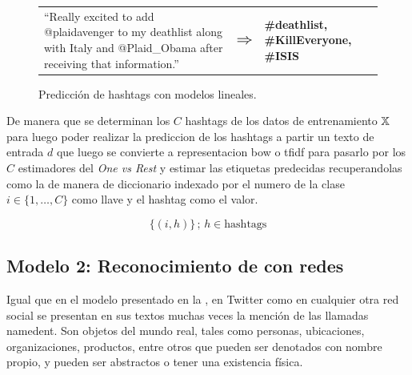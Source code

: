 \begin{figure}[H]
  \centering
  \begin{tabular}{p{} p{} p{}}
    ``Really excited to add @plaidavenger to my deathlist along with Italy and @Plaid\_Obama after receiving that information.'' & $\mathlarger{\mathlarger{\mathlarger{\Rightarrow}}}$ & \textbf{\#deathlist, \#KillEveryone, \#ISIS}
  \end{tabular}
  \decoRule
  \caption{Predicción de hashtags con modelos lineales.}
  \label{fig:tweet-prediction}
\end{figure}

De manera que se determinan los $C$ hashtags de los datos de entrenamiento ${\mathbb{X}}$ para luego poder realizar la prediccion de los hashtags a partir un texto de entrada $d$ que luego se convierte a representacion \gls{bow} o \gls{tfidf} para pasarlo por los $C$ estimadores del \emph{One vs Rest} y estimar las etiquetas predecidas recuperandolas como la  de manera de diccionario indexado por el numero de la clase $i \in \{1, \ldots, C\}$ como llave y el hashtag como el valor.

\begin{equation} \label{eq:ovr-inverse-transform}
    \{(i, h)\} \,;\, h \in \text{hashtags}
\end{equation}


\subsection{Modelo 2: Reconocimiento de  con redes }
Igual que en el modelo presentado en la , en Twitter como en cualquier otra red social se presentan en sus textos muchas veces la mención de las llamadas \gls{namedent}. Son objetos del mundo real, tales como personas, ubicaciones, organizaciones, productos, entre otros que pueden ser denotados con nombre propio, y pueden ser abstractos o tener una existencia física.

